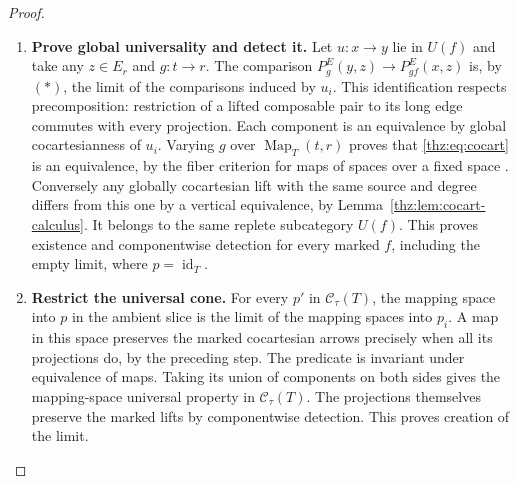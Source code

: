 \documentclass[oneside]{article}
\theoremstyle{plain}
\theoremstyle{definition}
\theoremstyle{remark}
\newcommand{\Map}{\operatorname{Map}}
\newcommand{\id}{\operatorname{id}}
\begin{document}
\begin{proof}
\begin{enumerate}
Consequently $U(f):=\lim_iU_i(f)\to E_s$ is an equivalence.
Its map into $\mathcal D_f(p)$ is fully faithful with replete image
the lifts whose projections belong to $U_i(f)$ for every $i$:
full subcategories restrict objects and inherit all mapping spaces,
so compatible families of such objects and their coherences factor
through the limit of the full subcategories. In particular every
source admits a lift in $U(f)$.

\item \textbf{Prove global universality and detect it.}
Let $u:x\to y$ lie in $U(f)$ and take any $z\in E_r$ and
$g:t\to r$. The comparison
$P_g^E(y,z)\to P_{gf}^E(x,z)$ is, by $(*)$, the limit of the
comparisons induced by $u_i$. This identification respects
precomposition: restriction of a lifted composable pair to its
long edge commutes with every projection. Each component is an
equivalence by global cocartesianness of $u_i$. Varying $g$ over
$\Map_T(t,r)$ proves that \eqref{thz:eq:cocart} is an equivalence,
by the fiber criterion for maps of spaces over a fixed space
\cite[Prop.~5.1.2.1, dual]{Kerodon}. Conversely any globally
cocartesian lift with the same source and degree differs from this
one by a vertical equivalence, by Lemma~\ref{thz:lem:cocart-calculus}.
It belongs to the same replete subcategory $U(f)$. This proves
existence and componentwise detection for every marked $f$,
including the empty limit, where $p=\id_T$.

\item \textbf{Restrict the universal cone.}
For every $p'$ in $\mathscr C_\tau(T)$, the mapping space into $p$
in the ambient slice is the limit of the mapping spaces into $p_i$.
A map in this space preserves the marked cocartesian arrows precisely
when all its projections do, by the preceding step. The predicate is
invariant under equivalence of maps. Taking its union of components
on both sides gives the mapping-space universal property in
$\mathscr C_\tau(T)$. The projections themselves preserve the marked
lifts by componentwise detection. This proves creation of the limit.
\qedhere
\end{enumerate}
\end{proof}
\end{document}
